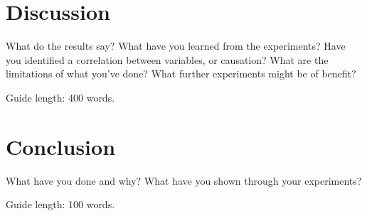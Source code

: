 \documentclass{csfourzero}
\begin{document}




\section{Discussion}
\label{sec:discuss}

What do the results say? What have you learned from the
experiments? Have you identified a correlation between variables, or
causation? What are the limitations of what you've done? What further
experiments might be of benefit?

Guide length: 400 words.

\section{Conclusion}
\label{sec:conc}

What have you done and why? What have you shown through your
experiments?

Guide length: 100 words.


\end{document}
